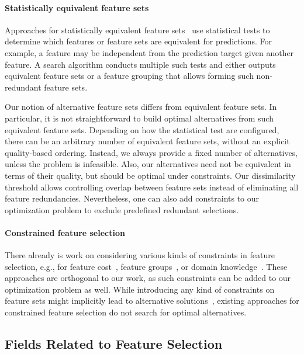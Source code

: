 \documentclass{article}
\theoremstyle{definition}
\begin{document}
\paragraph{Statistically equivalent feature sets}

Approaches for statistically equivalent feature sets~\cite{borboudakis2021extending, lagani2017feature} use statistical tests to determine which features or feature sets are equivalent for predictions.
For example, a feature may be independent from the prediction target given another feature.
A search algorithm conducts multiple such tests and either outputs equivalent feature sets or a feature grouping that allows forming such non-redundant feature sets.

Our notion of alternative feature sets differs from equivalent feature sets.
In particular, it is not straightforward to build optimal alternatives from such equivalent feature sets.
Depending on how the statistical test are configured, there can be an arbitrary number of equivalent feature sets, without an explicit quality-based ordering.
Instead, we always provide a fixed number of alternatives, unless the problem is infeasible.
Also, our alternatives need not be equivalent in terms of their quality, but should be optimal under constraints.
Our dissimilarity threshold allows controlling overlap between feature sets instead of eliminating all feature redundancies.
Nevertheless, one can also add constraints to our optimization problem to exclude predefined redundant selections.

\paragraph{Constrained feature selection}

There already is work on considering various kinds of constraints in feature selection, e.g., for feature cost~\cite{paclik2002feature}, feature groups~\cite{yuan2006model}, or domain knowledge~\cite{bach2022empirical, groves2015toward}.
These approaches are orthogonal to our work, as such constraints can be added to our optimization problem as well.
While introducing any kind of constraints on feature sets might implicitly lead to alternative solutions~\cite{bach2022empirical}, existing approaches for constrained feature selection do not search for optimal alternatives.

\subsection{Fields Related to Feature Selection}
\end{document}
